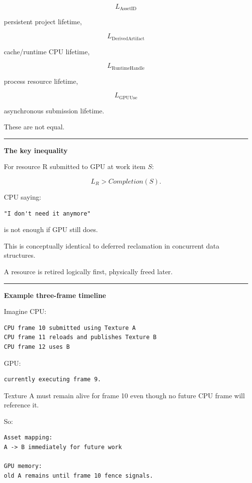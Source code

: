 \[
L_{\text{AssetID}}
\]

persistent project lifetime,

\[
L_{\text{DerivedArtifact}}
\]

cache/runtime CPU lifetime,

\[
L_{\text{RuntimeHandle}}
\]

process resource lifetime,

\[
L_{\text{GPUUse}}
\]

asynchronous submission lifetime.

These are not equal.

\begin{center}\rule{0.5\linewidth}{0.5pt}\end{center}

\textbf{The key inequality}

For resource R submitted to GPU at work item \(S\):

\[
\boxed{
L_R
>
Completion(S).
}
\]

CPU saying:

\begin{verbatim}
"I don't need it anymore"
\end{verbatim}

is not enough if GPU still does.

This is conceptually identical to deferred reclamation in concurrent data structures.

A resource is retired logically first, physically freed later.

\begin{center}\rule{0.5\linewidth}{0.5pt}\end{center}

\textbf{Example three-frame timeline}

Imagine CPU:

\begin{verbatim}
CPU frame 10 submitted using Texture A
CPU frame 11 reloads and publishes Texture B
CPU frame 12 uses B
\end{verbatim}

GPU:

\begin{verbatim}
currently executing frame 9.
\end{verbatim}

Texture A must remain alive for frame 10 even though no future CPU frame will reference it.

So:

\begin{verbatim}
Asset mapping:
A -> B immediately for future work

GPU memory:
old A remains until frame 10 fence signals.
\end{verbatim}


